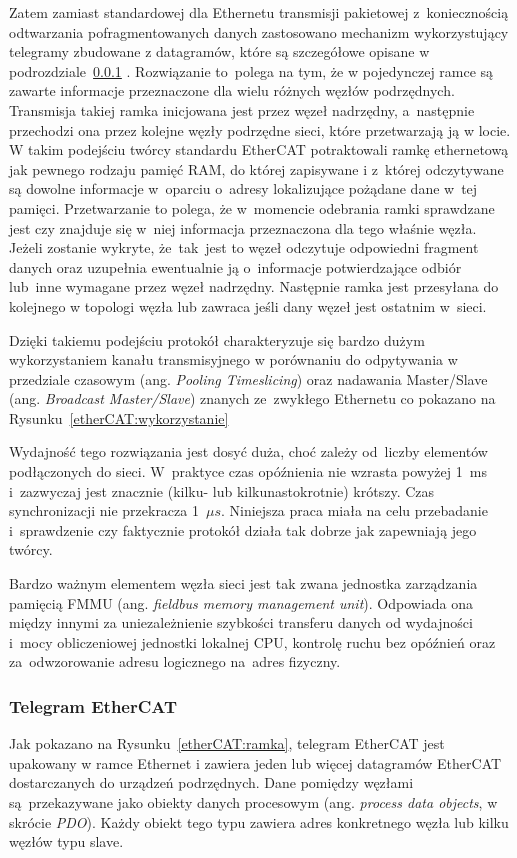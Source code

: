 Zatem zamiast standardowej dla Ethernetu transmisji pakietowej z~koniecznością odtwarzania pofragmentowanych danych zastosowano mechanizm wykorzystujący telegramy zbudowane z datagramów, które są szczegółowe opisane w podrozdziale~\ref{subsec:telegram} .
Rozwiązanie to~polega na tym, że w pojedynczej ramce są zawarte informacje przeznaczone dla wielu różnych węzłów podrzędnych. Transmisja takiej ramka inicjowana jest przez węzeł nadrzędny, a~następnie przechodzi ona przez kolejne węzły podrzędne sieci, które przetwarzają ją w locie. W takim podejściu twórcy standardu EtherCAT potraktowali ramkę ethernetową jak pewnego rodzaju pamięć RAM, do której zapisywane i z~której odczytywane są dowolne informacje w~oparciu o~adresy lokalizujące pożądane dane w~tej pamięci.
Przetwarzanie to polega, że w~momencie odebrania ramki sprawdzane jest czy znajduje się w~niej informacja przeznaczona dla tego właśnie węzła. Jeżeli zostanie wykryte, że~tak~jest  to węzeł odczytuje odpowiedni fragment danych oraz uzupełnia ewentualnie ją o~informacje potwierdzające odbiór lub~inne wymagane przez węzeł nadrzędny. Następnie ramka jest przesyłana do kolejnego w topologi węzła lub zawraca jeśli dany węzeł jest ostatnim w~sieci. 

Dzięki takiemu podejściu protokół charakteryzuje się bardzo dużym wykorzystaniem kanału transmisyjnego w porównaniu do odpytywania w przedziale czasowym (ang. \textit{Pooling Timeslicing}) oraz nadawania Master/Slave (ang. \textit{Broadcast Master/Slave}) znanych ze~zwykłego Ethernetu co pokazano na Rysunku~\ref{etherCAT:wykorzystanie}


Wydajność tego rozwiązania jest dosyć duża, choć zależy od~liczby elementów podłączonych do sieci. W~praktyce czas opóźnienia nie wzrasta powyżej 1~ms i~zazwyczaj jest znacznie (kilku- lub kilkunastokrotnie) krótszy. Czas synchronizacji nie przekracza 1~$\mu s$. Niniejsza praca miała na celu przebadanie i~sprawdzenie czy faktycznie protokół działa tak dobrze jak zapewniają jego twórcy.

Bardzo ważnym elementem węzła sieci jest tak zwana jednostka zarządzania pamięcią FMMU (ang. \textit{fieldbus memory management unit}). Odpowiada ona między innymi za uniezależnienie szybkości transferu danych od wydajności i~mocy obliczeniowej jednostki lokalnej CPU, kontrolę ruchu bez opóźnień oraz za~odwzorowanie adresu logicznego na~adres fizyczny.

\subsubsection{Telegram EtherCAT}
\label{subsec:telegram}
Jak pokazano na Rysunku~\ref{etherCAT:ramka}, telegram EtherCAT jest upakowany w  ramce Ethernet i  zawiera jeden lub więcej datagramów EtherCAT dostarczanych do urządzeń podrzędnych. Dane pomiędzy węzłami są~przekazywane jako obiekty danych procesowym (ang. \textit{process data objects}, w skrócie \textit{PDO}). Każdy obiekt tego typu zawiera adres konkretnego węzła lub kilku węzłów typu slave.

